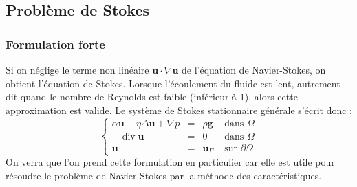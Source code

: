 \subsection{Problème de Stokes}
\subsubsection{Formulation forte}
Si on néglige le terme non linéaire $\mathbf{u} \cdot \nabla \mathbf{u}$ de l'équation de Navier-Stokes, on obtient l'équation de Stokes. Lorsque l'écoulement du fluide est lent, autrement dit quand le nombre de Reynolds est faible (inférieur à 1), alors cette approximation est valide. 
Le système de Stokes stationnaire générale s'écrit donc : 
\begin{equation}
\left\{\begin{aligned}
\alpha \mathbf{u}-\eta \Delta \mathbf{u}+\nabla p &=& \rho \mathbf{g} & \text { dans } \Omega \\
-\operatorname{div} \mathbf{u}  &=&0 & \text { dans } \Omega \\
\mathbf{u} &=& \mathbf{u}_{\Gamma} & \text { sur } \partial \Omega
\end{aligned}\right.
\end{equation}
On verra que l'on prend cette formulation en particulier car elle est utile pour résoudre le problème de Navier-Stokes par la méthode des caractéristiques.


